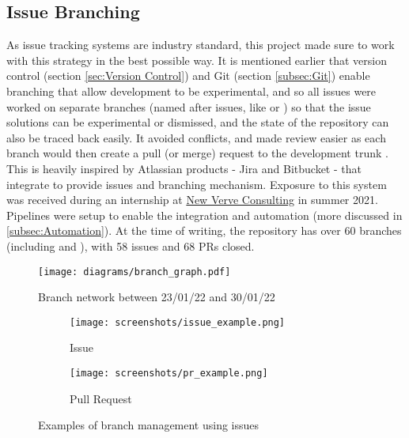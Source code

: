 \documentclass[../main.tex]{subfiles}
\begin{document}
\subsection{Issue Branching}

As issue tracking systems are industry standard, this project made sure to work with this strategy in the best possible way. It is mentioned earlier that version control (section \ref{sec:Version Control}) and Git (section \ref{subsec:Git}) enable branching that allow development to be experimental, and so all issues were worked on separate branches (named after issues, like  or ) so that the issue solutions can be experimental or dismissed, and the state of the repository can also be traced back easily. It avoided conflicts, and made review easier as each branch would then create a pull (or merge) request to the development trunk . This is heavily inspired by Atlassian products - Jira and Bitbucket - that integrate to provide issues and branching mechanism. Exposure to this system was received during an internship at \href{https://www.newverveconsulting.com/}{New Verve Consulting} in summer 2021. Pipelines were setup to enable the integration and automation (more discussed in \ref{subsec:Automation}). At the time of writing, the repository has over 60 branches (including  and ), with 58 issues and 68 PRs closed.

\begin{figure}
    \centering
    \texttt{[image: diagrams/branch\_graph.pdf]}
    \caption{Branch network between 23/01/22 and 30/01/22}%
\end{figure}

\begin{figure}
    \centering
    \noindent\begin{subfigure}{.49\textwidth}
    \centering
    \texttt{[image: screenshots/issue\_example.png]}
    \caption{Issue}
    \end{subfigure}\hfill
    \begin{subfigure}{.49\textwidth}
    \centering
    \texttt{[image: screenshots/pr\_example.png]}
    \caption{Pull Request}
    \end{subfigure}
    \caption{Examples of branch management using issues}%
\end{figure}
\end{document}
